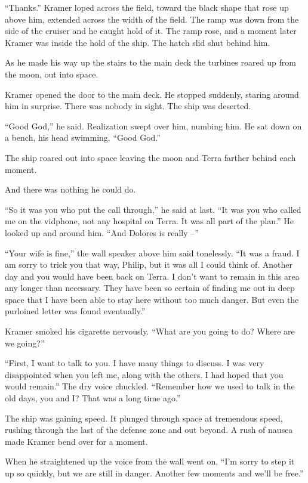 \documentclass[12pt,a5paper]{book}
\newcommand{\storybreak}{%
  \par\vspace{0.6\baselineskip}
  \begin{center}\color{coveraccent}\small *\enspace *\enspace *\end{center}
  \vspace{0.3\baselineskip}\noindent\ignorespaces
}
\begin{document}
“Thanks.” Kramer loped across the field, toward the black shape that rose up above him, extended across the width of the field. The ramp was down from the side of the cruiser and he caught hold of it. The ramp rose, and a moment later Kramer was inside the hold of the ship. The hatch slid shut behind him.

As he made his way up the stairs to the main deck the turbines roared up from the moon, out into space.

Kramer opened the door to the main deck. He stopped suddenly, staring around him in surprise. There was nobody in sight. The ship was deserted.

“Good God,” he said. Realization swept over him, numbing him. He sat down on a bench, his head swimming. “Good God.”

The ship roared out into space leaving the moon and Terra farther behind each moment.

And there was nothing he could do.

\storybreak
“So it was you who put the call through,” he said at last. “It was you who called me on the vidphone, not any hospital on Terra. It was all part of the plan.” He looked up and around him. “And Dolores is really –”

“Your wife is fine,” the wall speaker above him said tonelessly. “It was a fraud. I am sorry to trick you that way, Philip, but it was all I could think of. Another day and you would have been back on Terra. I don't want to remain in this area any longer than necessary. They have been so certain of finding me out in deep space that I have been able to stay here without too much danger. But even the purloined letter was found eventually.”

Kramer smoked his cigarette nervously. “What are you going to do? Where are we going?”

“First, I want to talk to you. I have many things to discuss. I was very disappointed when you left me, along with the others. I had hoped that you would remain.” The dry voice chuckled. “Remember how we used to talk in the old days, you and I? That was a long time ago.”

The ship was gaining speed. It plunged through space at tremendous speed, rushing through the last of the defense zone and out beyond. A rush of nausea made Kramer bend over for a moment.

When he straightened up the voice from the wall went on, “I'm sorry to step it up so quickly, but we are still in danger. Another few moments and we'll be free.”
\end{document}
